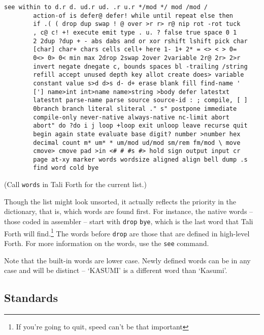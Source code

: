 \begin{lstlisting}[frame=lines]
        see within to d.r d. ud.r ud. .r u.r */mod */ mod /mod /
        action-of is defer@ defer! while until repeat else then
        if .( ( drop dup swap ! @ over >r r> r@ nip rot -rot tuck
        , c@ c! +! execute emit type . u. ? false true space 0 1
        2 2dup ?dup + - abs dabs and or xor rshift lshift pick char
        [char] char+ chars cells cell+ here 1- 1+ 2* = <> < > 0=
        0<> 0> 0< min max 2drop 2swap 2over 2variable 2r@ 2r> 2>r
        invert negate dnegate c, bounds spaces bl -trailing /string
        refill accept unused depth key allot create does> variable
        constant value s>d d>s d- d+ erase blank fill find-name '
        ['] name>int int>name name>string >body defer latestxt
        latestnt parse-name parse source source-id : ; compile, [ ]
        0branch branch literal sliteral ." s" postpone immediate
        compile-only never-native always-native nc-limit abort
        abort" do ?do i j loop +loop exit unloop leave recurse quit
        begin again state evaluate base digit? number >number hex
        decimal count m* um* * um/mod ud/mod sm/rem fm/mod \ move
        cmove> cmove pad >in <# # #s #> hold sign output input cr
        page at-xy marker words wordsize aligned align bell dump .s
        find word cold bye
\end{lstlisting}

\noindent (Call \texttt{words} in Tali Forth for the
current list.)

Though the list might look unsorted, it actually reflects the priority in the
dictionary, that is, which words are found first. For
instance, the native words -- those coded in assembler --
start with \texttt{drop}
\texttt{bye}, which is the last word that Tali Forth
will find.\footnote{If you're going to quit, speed can't be that important} The
words before \texttt{drop} are those that are defined in high-level Forth. For
more information on the words, use the \texttt{see}
command.

Note that the built-in words are lower case. Newly defined
words can be in any case and will be distinct -- `KASUMI' is a different word
than `Kasumi'.


\subsection{Standards}

